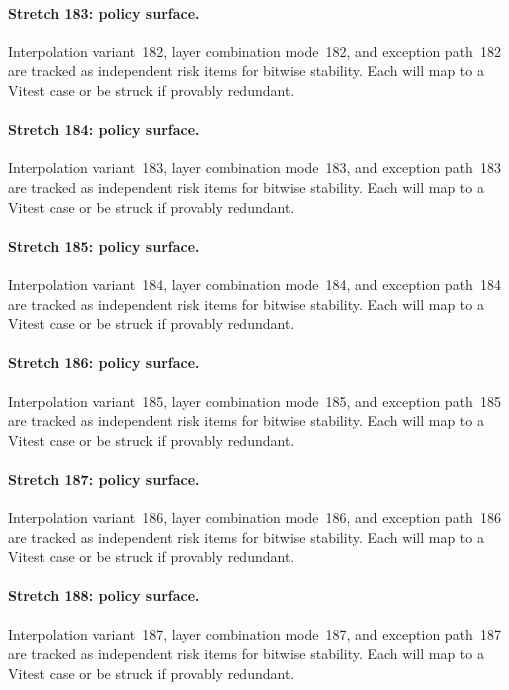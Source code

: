 \documentclass[sigconf,nonacm]{acmart}
\begin{document}
\paragraph{Stretch 183: policy surface.}
Interpolation variant~182, layer combination mode~182, and exception path~182 are tracked as independent risk items for bitwise stability. Each will map to a Vitest case or be struck if provably redundant. %

\paragraph{Stretch 184: policy surface.}
Interpolation variant~183, layer combination mode~183, and exception path~183 are tracked as independent risk items for bitwise stability. Each will map to a Vitest case or be struck if provably redundant. %

\paragraph{Stretch 185: policy surface.}
Interpolation variant~184, layer combination mode~184, and exception path~184 are tracked as independent risk items for bitwise stability. Each will map to a Vitest case or be struck if provably redundant. %

\paragraph{Stretch 186: policy surface.}
Interpolation variant~185, layer combination mode~185, and exception path~185 are tracked as independent risk items for bitwise stability. Each will map to a Vitest case or be struck if provably redundant. %

\paragraph{Stretch 187: policy surface.}
Interpolation variant~186, layer combination mode~186, and exception path~186 are tracked as independent risk items for bitwise stability. Each will map to a Vitest case or be struck if provably redundant. %

\paragraph{Stretch 188: policy surface.}
Interpolation variant~187, layer combination mode~187, and exception path~187 are tracked as independent risk items for bitwise stability. Each will map to a Vitest case or be struck if provably redundant. %
\end{document}
